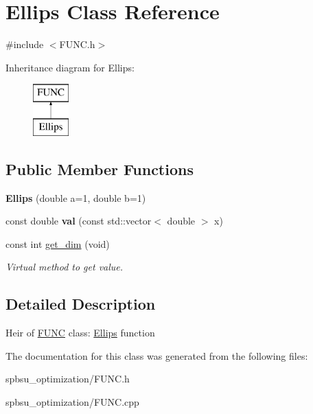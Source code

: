 \hypertarget{class_ellips}{}\section{Ellips Class Reference}
\label{class_ellips}


{\ttfamily \#include $<$F\+U\+N\+C.\+h$>$}

Inheritance diagram for Ellips\+:\begin{figure}[H]
\begin{center}
\leavevmode
\includegraphics[height=2.000000cm]{class_ellips}
\end{center}
\end{figure}
\subsection*{Public Member Functions}
\begin{DoxyCompactItemize}
\item 
\mbox{\label{class_ellips_a037fd4f99158c28dd2c8a92fdfb0cbb7}} 
{\bfseries Ellips} (double a=1, double b=1)
\item 
\mbox{\label{class_ellips_ab8df36083101638e1e30896da46893bc}} 
const double {\bfseries val} (const std\+::vector$<$ double $>$ x)
\item 
\mbox{\label{class_ellips_a7297af830c494ecafabac5b1343ee07d}} 
const int \hyperlink{class_ellips_a7297af830c494ecafabac5b1343ee07d}{get\+\_\+dim} (void)
\begin{DoxyCompactList}\small\item\em Virtual method to get value. \end{DoxyCompactList}\end{DoxyCompactItemize}


\subsection{Detailed Description}
Heir of \hyperlink{class_f_u_n_c}{F\+U\+NC} class\+: \hyperlink{class_ellips}{Ellips} function 

The documentation for this class was generated from the following files\+:\begin{DoxyCompactItemize}
\item 
spbsu\+\_\+optimization/F\+U\+N\+C.\+h\item 
spbsu\+\_\+optimization/F\+U\+N\+C.\+cpp\end{DoxyCompactItemize}
